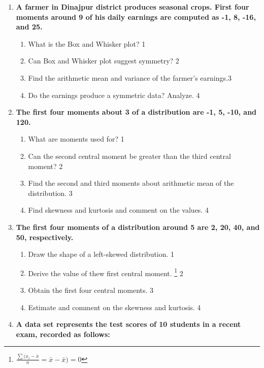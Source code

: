 \documentclass[a4paper,oneside]{book}
\begin{document}
\begin{enumerate}
 \item
	  \textbf{A farmer in Dinajpur district produces seasonal crops. First four moments around 9 of his daily earnings are computed as -1, 8, -16, and 25.}
  
  \begin{enumerate}
    \item
	What is the Box and Whisker plot? \hfill 1
    \item
	Can Box and Whisker plot suggest symmetry? \hfill 2
    \item  
	 Find the arithmetic mean and variance of the farmer's earnings.\hfill 3
    \item
	Do the earnings produce a symmetric data? Analyze. \hfill 4
  \end{enumerate}

 \item
	  \textbf{The first four moments about 3 of a distribution are -1, 5, -10, and 120.} 
  
  \begin{enumerate}
    \item
	What are moments used for? \hfill 1
    \item
	Can the second central moment be greater than the third central moment? \hfill 2
    \item  
	Find the second and third moments about arithmetic mean of the distribution. \hfill 3
    \item
	Find skewness and kurtosis and comment on the values.  \hfill 4
\end{enumerate}

  \item
	  \textbf{The first four moments of a distribution around 5 are 2, 20, 40, and 50, respectively.} 
  
  \begin{enumerate}
	\item 
	Draw the shape of a left-skewed distribution. \hfill 1
	\item 
	Derive the value of thew first central moment. \footnote{$\frac{\sum(x_i-\bar x}{n} = \bar x - \bar x) = 0$} \hfill 2
    \item
    Obtain the first four central moments. \hfill 3
    \item
	Estimate and comment on the skewness and kurtosis. \hfill 4
  \end{enumerate}
  
  \item
\textbf{A data set represents the test scores of 10 students in a recent exam, recorded as follows:}


\end{enumerate}
\end{document}
